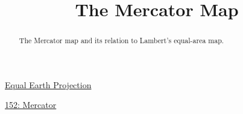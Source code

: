 \documentclass{ximera}
\title{The Mercator Map}
\begin{document}
\begin{abstract}
The Mercator map and its relation to Lambert's equal-area map.
\end{abstract}
\maketitle

\href{https://www.nytimes.com/2025/08/19/world/africa/africa-map-mercator.html}{Equal Earth Projection}


\begin{onlineOnly}
    \begin{center}
\end{center}
\end{onlineOnly}

\href{https://www.geogebra.org/classic/mvp9zvge}{152: Mercator}
\end{document}
